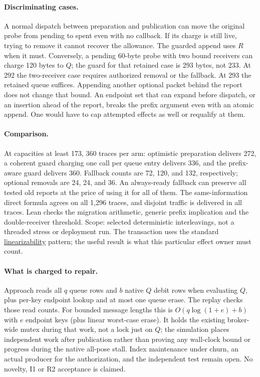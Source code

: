 \documentclass[11pt]{article}
\begin{document}
\paragraph{Discriminating cases.}
A normal dispatch between preparation and publication can move the original
probe from pending to spent even with no callback. If its charge is still
live, trying to remove it cannot recover the allowance. The guarded append
uses \(R\) when it must. Conversely, a pending 60-byte probe with two bound
receivers can charge 120 bytes to \(Q\); the guard for that retained case
is 293 bytes, not 233. At 292 the two-receiver case requires authorized
removal or the fallback. At 293 the retained queue suffices. Appending
another optional packet behind the report does not change that bound.
An endpoint set that can expand before dispatch, or an insertion ahead
of the report, breaks the prefix argument even with an atomic append.
One would have to cap attempted effects as well or requalify at them.

\paragraph{Comparison.}
At capacities at least 173, 360 traces per arm: optimistic preparation
delivers 272, a coherent guard charging one call per queue entry delivers
336, and the prefix-aware guard delivers 360. Fallback counts are 72, 120,
and 132, respectively; optional removals are 24, 24, and 36. An
always-ready fallback can preserve all tested old reports at the price of
using it for all of them. The same-information direct formula agrees on all
1,296 traces, and disjoint traffic is delivered in all traces. Lean checks
the migration arithmetic, generic prefix implication and the double-receiver
threshold. Scope: selected deterministic interleavings, not a threaded stress
or deployment run. The transaction uses the standard
\href{https://www.cs.columbia.edu/~wing/publications/HerlihyWing90.pdf}{linearizability}
pattern; the useful result is what this particular effect owner must count.

\paragraph{What is charged to repair.}
Approach reads all \(q\) queue rows and \(b\) native \(Q\) debit rows when
evaluating \(Q\), plus per-key endpoint lookup and at most one queue erase.
The replay checks those read counts. For bounded message lengths this is
\(O(q\log(1+e)+b)\) with \(e\) endpoint keys (plus linear worst-case erase).
It holds the existing broker-wide mutex during that work, not a lock just
on \(Q\); the simulation places independent work after publication rather
than proving any wall-clock bound or progress during the native all-pose
stall. Index maintenance under churn, an actual producer for the
authorization, and the independent test remain open. No novelty, I1 or
R2 acceptance is claimed.
\end{document}
